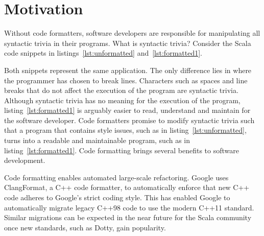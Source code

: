 \section{Motivation} %
\label{sec:Introduction}
\lstset{style=scala}
Without code formatters, software developers are responsible for manipulating all syntactic trivia in their programs.
What is syntactic trivia?
Consider the Scala code snippets in listings~\ref{lst:unformatted} and~\ref{lst:formatted1}.

\begin{minipage}{.45\textwidth}

\end{minipage}
\hfil
\begin{minipage}{.45\textwidth}

\end{minipage}

Both snippets represent the same application.
The only difference lies in where the programmer has chosen to break lines.
Characters such as spaces and line breaks that do not affect the execution of the program are syntactic trivia.
Although syntactic trivia has no meaning for the execution of the program, listing~\ref{lst:formatted1} is arguably easier to read, understand and maintain for the software developer.
Code formatters promise to modify syntactic trivia such that a program that contains style issues, such as in listing~\ref{lst:unformatted}, turns into a readable and maintainable program, such as in listing~\ref{lst:formatted1}.
Code formatting brings several benefits to software development.

Code formatting enables automated large-scale refactoring.
Google uses ClangFormat\autocite{jasper_clangformat_2013}, a C++ code formatter, to automatically enforce that new C++ code adheres to Google's strict coding style\autocite{_google_????}.
This has enabled Google to automatically migrate legacy C++98 code to use the modern C++11 standard\autocite{wright_large-scale_2013}.
Similar migrations can be expected in the near future for the Scala community once new standards, such as Dotty\autocite{rompf_f_2015}, gain popularity.

